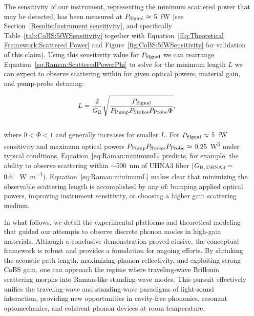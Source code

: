 The sensitivity of our instrument, representing the minimum scattered power that may be detected, has been measured at \(P_{\rm Signal}\approx\) \SI{5}{\femto\watt} (see Section~\ref{Results:Instrument sensitivity}, and specifically Table~\ref{tab:CoBS:5fWSensitivity} together with Equation~\ref{Eq:Theoretical Framework:Scattered Power} and Figure~\ref{fig:CoBS:5fWSensitivity} for validation of this claim). Using this sensitivity value for \(P_{\rm Signal}\) we can rearrange Equation~\ref{eq:Raman:ScatteredPowerPhi} to solve for the minimum length \(L\) we can expect to observe scattering within for given optical powers, material gain, and pump-probe detuning:

\begin{equation}
  L = \frac{2}{G_{\rm B}}\sqrt{\frac{P_{\rm Signal}}{P_{\rm Pump}P_{\rm Stokes}P_{\rm Probe}\Phi}},
  \label{eq:Raman:minimumL}
\end{equation}
\\
where \(0 < \Phi < 1\) and generally increases for smaller \(L\). For \(P_{\rm Signal}\approx\) \SI{5}{\femto\watt} sensitivity and maximum optical powers \(P_{\rm Pump}P_{\rm Stokes}P_{\rm Probe}\approx\) \SI{0.25}{\cubic\watt} under typical conditions, Equation~\ref{eq:Raman:minimumL} predicts, for example, the ability to observe scattering within \(\sim\)\SI{500}{\nano\meter} of \ac{UHNA3} fiber (\(G_{\rm B,\,UHNA3}=\) \SI{0.6}{\per\watt\per\meter}). Equation~\ref{eq:Raman:minimumL} makes clear that minimizing the observable scattering length is accomplished by any of: bumping applied optical powers, improving instrument sensitivity, or choosing a higher gain scattering medium.

In what follows, we detail the experimental platforms and theoretical modeling that guided our attempts to observe discrete phonon modes in high-gain materials. Although a conclusive demonstration proved elusive, the conceptual framework is robust and provides a foundation for ongoing efforts. By shrinking the acoustic path length, maximizing phonon reflectivity, and exploiting strong \ac{CoBS} gain, one can approach the regime where traveling-wave Brillouin scattering morphs into Raman-like standing-wave modes. This pursuit effectively unifies the traveling-wave and standing-wave paradigms of light-sound interaction, providing new opportunities in cavity-free phononics, resonant optomechanics, and coherent phonon devices at room temperature.


